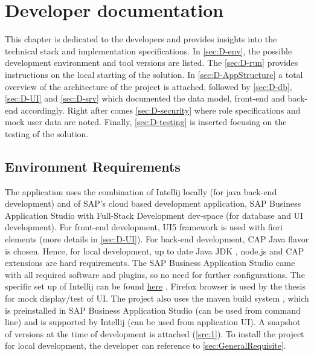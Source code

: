 \chapter{Developer documentation}
\label{ch:impl}

This chapter is dedicated to the developers and provides insights into the technical stack and implementation specifications. In \autoref{sec:D-env}, the possible development environment and tool versions are listed. The \autoref{sec:D-run} provides instructions on the local starting of the solution. In \autoref{sec:D-AppStructure} a total overview of the architecture of the project is attached, followed by \autoref{sec:D-db}, \autoref{sec:D-UI} and \autoref{sec:D-srv} which documented the data model, front-end and back-end accordingly. Right after comes \autoref{sec:D-security} where role specifications and mock user data are noted. Finally, \autoref{sec:D-testing} is inserted focusing on the testing of the solution. 

\section{Environment Requirements}
\label{sec:D-env}

The application uses the combination of Intellij \cite{intellij} locally (for java back-end development) and of SAP's cloud based development application, SAP Business Application Studio \cite{bas} with Full-Stack Development dev-space (for database and UI development).
For front-end development, UI5 framework \cite{ui5-toolkit} is used with fiori elements \cite{fiorielements} (more details in \ref{sec:D-UI}). 
For back-end development, CAP Java \cite{cap-about}\cite{cap-java} flavor is chosen.
Hence, for local development, up to date Java JDK \cite{java}, node.js \cite{nodejs} and CAP extensions are hard requirements. 
The SAP Business Application Studio came with all required software and plugins, so no need for further configurations. The specific set up of Intellij can be found \href{https://github.com/SAP-samples/cloud-cap-samples-java\#using-intellij-idea-community-and-ultimate}{here} \cite{proj-setup-intellij}.
Firefox \cite{firefox} browser is used by the thesis for mock display/test of UI. The project also uses the maven build system \cite{maven}, which is preinstalled in SAP Business Application Studio (can be used from command line) and is supported by Intellij (can be used from application UI). 
A snapshot of versions at the time of development is attached (\autoref{src:1}). To install the project for local development, the developer can reference to \autoref{sec:GeneralRequisite}.

